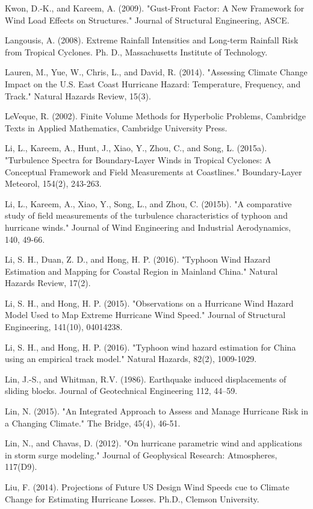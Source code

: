 Kwon, D.-K., and Kareem, A. (2009). "Gust-Front Factor: A New Framework for Wind Load Effects on Structures." Journal of Structural Engineering, ASCE.

Langousis, A. (2008). Extreme Rainfall Intensities and Long-term Rainfall Risk from Tropical Cyclones. Ph. D., Massachusetts Institute of Technology.

Lauren, M., Yue, W., Chris, L., and David, R. (2014). "Assessing Climate Change Impact on the U.S. East Coast Hurricane Hazard: Temperature, Frequency, and Track." Natural Hazards Review, 15(3).

LeVeque, R. (2002). Finite Volume Methods for Hyperbolic Problems, Cambridge Texts in Applied Mathematics, Cambridge University Press.

Li, L., Kareem, A., Hunt, J., Xiao, Y., Zhou, C., and Song, L. (2015a). "Turbulence Spectra for Boundary-Layer Winds in Tropical Cyclones: A Conceptual Framework and Field Measurements at Coastlines." Boundary-Layer Meteorol, 154(2), 243-263.

Li, L., Kareem, A., Xiao, Y., Song, L., and Zhou, C. (2015b). "A comparative study of field measurements of the turbulence characteristics of typhoon and hurricane winds." Journal of Wind Engineering and Industrial Aerodynamics, 140, 49-66.

Li, S. H., Duan, Z. D., and Hong, H. P. (2016). "Typhoon Wind Hazard Estimation and Mapping for Coastal Region in Mainland China." Natural Hazards Review, 17(2).

Li, S. H., and Hong, H. P. (2015). "Observations on a Hurricane Wind Hazard Model Used to Map Extreme Hurricane Wind Speed." Journal of Structural Engineering, 141(10), 04014238.

Li, S. H., and Hong, H. P. (2016). "Typhoon wind hazard estimation for China using an empirical track model." Natural Hazards, 82(2), 1009-1029.

Lin, J.-S., and Whitman, R.V. (1986). Earthquake induced displacements of sliding blocks. Journal of Geotechnical Engineering 112, 44–59.

Lin, N. (2015). "An Integrated Approach to Assess and Manage Hurricane Risk in a Changing Climate." The Bridge, 45(4), 46-51.

Lin, N., and Chavas, D. (2012). "On hurricane parametric wind and applications in storm surge modeling." Journal of Geophysical Research: Atmospheres, 117(D9).

Liu, F. (2014). Projections of Future US Design Wind Speeds cue to Climate Change for Estimating Hurricane Losses. Ph.D., Clemson University.

